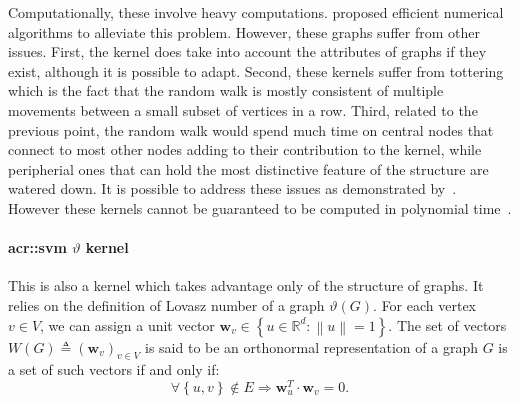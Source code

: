                 Computationally, these involve heavy computations.
                \textcite{vishwanathan2010graph} proposed efficient numerical algorithms to alleviate this problem.
                However, these graphs suffer from other issues.
                First, the kernel does take into account the attributes of graphs if they exist, although it is possible to adapt.
                Second, these kernels suffer from tottering which is the fact that the random walk is mostly consistent of multiple movements between a small subset of vertices in a row.
                Third, related to the previous point, the random walk would spend much time on central nodes that connect to most other nodes adding to their contribution to the kernel, while peripherial ones that can hold the most distinctive feature of the structure are watered down.
                It is possible to address these issues as demonstrated by~\textcite{horvath2004cyclic, mahe2004extensions}.
                However these kernels cannot be guaranteed to be computed in polynomial time~\parencite{vishwanathan2010graph}.

            \paragraph{\gls*{acr::svm} $\vartheta$ kernel}
                This is also a kernel which takes advantage only of the structure of graphs.
                It relies on the definition of Lovasz number of a graph $\vartheta(G)$.
                For each vertex $v \in V$, we can assign a unit vector \(\bm{w}_v \in \left\{u \in \mathbb{R}^d: \left\lVert u \right\rVert = 1 \right\}\).
                The set of vectors \(W(G) \triangleq \left(\bm{w}_v\right)_{v \in V}\) is said to be an orthonormal representation of a graph $G$ is a set of such vectors if and only if:
                \begin{equation*}
                    \forall \left\{u,v\right\} \notin E \Rightarrow \bm{w}_u^T\cdot \bm{w}_v=0.
                \end{equation*}

